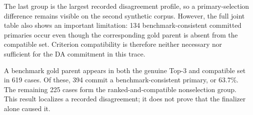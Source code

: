 The last group is the largest recorded disagreement profile, so a primary-selection difference remains visible on the second synthetic corpus. However, the full joint table also shows an important limitation: 134 benchmark-consistent committed primaries occur even though the corresponding gold parent is absent from the compatible set. Criterion compatibility is therefore neither necessary nor sufficient for the DA commitment in this trace.

A benchmark gold parent appears in both the genuine Top-3 and compatible set in 619 cases. Of these, 394 commit a benchmark-consistent primary, or 63.7\%. The remaining 225 cases form the ranked-and-compatible nonselection group. This result localizes a recorded disagreement; it does not prove that the finalizer alone caused it.

